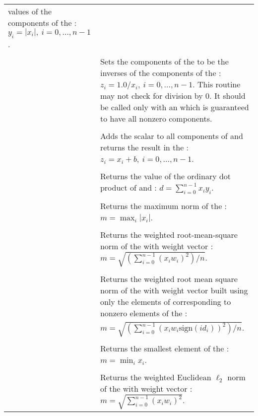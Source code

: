 \begin{xtabular}{|p{\colone}|p{\coltwo}|}
values of the components of the  :
$y_i = | x_i | , \: i=0,\ldots,n-1$.
\\[2mm]
 &  \\
& Sets the components of the   to be the inverses
of the components of the  :
$z_i = 1.0 /  x_i  , \: i=0,\ldots,n-1$. This routine
may not check for division by $0$. It should be called only with an 
 which is guaranteed to have all nonzero components.
\\[2mm]
 &  \\
& Adds the  scalar  to all components of  
and returns the result in the  :
$z_i = x_i + b , \: i=0,\ldots,n-1$.
\\[2mm]
 &  \\
& Returns the value of the ordinary dot product of  and :
$d=\sum_{i=0}^{n-1} x_i y_i$.
\\[2mm]
 &  \\
& Returns the maximum norm of the  :
$m = \max_{i} | x_i |$.
\\[2mm]
 &  \\
& Returns the weighted root-mean-square norm of the   with
 weight vector :
$m = \sqrt{\left( \sum_{i=0}^{n-1} (x_i w_i)^2 \right) / n}$.
\\[2mm]
 &  \\
& Returns the weighted root mean square norm of the   with
 weight vector  built using only 
the elements of  corresponding to
nonzero elements of the  :\\
&$m = \sqrt{\left( \sum_{i=0}^{n-1} (x_i w_i \text{sign}(id_i))^2 \right) / n}$.
\\[2mm]
 &  \\
& Returns the smallest element of the  :
$m = \min_i x_i $.
\\[2mm]
 &  \\
& Returns the weighted Euclidean $\ell_2$ norm of the  
with  weight vector : 
$m = \sqrt{\sum_{i=0}^{n-1} (x_i w_i)^2}$.

\end{xtabular}
